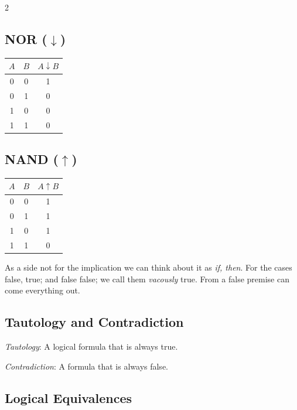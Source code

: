 \begin{multicols}{2}
	\vspace{1em}

	\subsection*{NOR (\(\downarrow\))}

	\begin{tabular}{ccc}
		\toprule
		\(A\) & \(B\) & \(A \downarrow B\) \\
		\midrule
		0   & 0   & 1                \\
		0   & 1   & 0                \\
		1   & 0   & 0                \\
		1   & 1   & 0                \\
		\bottomrule
	\end{tabular}

	\vspace{1em}

	\subsection*{NAND (\(\uparrow\))}

	\begin{tabular}{ccc}
		\toprule
		\(A\) & \(B\) & \(A \uparrow B\) \\
		\midrule
		0   & 0   & 1              \\
		0   & 1   & 1              \\
		1   & 0   & 1              \\
		1   & 1   & 0              \\
		\bottomrule
	\end{tabular}

\end{multicols}
\medskip

As a side not for the implication we can think about it as \emph{if, then}. For the cases 
false, true; and false false; we call them \emph{vacously} true. From a false premise can come everything out.

\subsection{Tautology and Contradiction}

\emph{Tautology}: A logical formula that is always true.

\emph{Contradiction}: A formula that is always false.

\subsection{Logical Equivalences}

